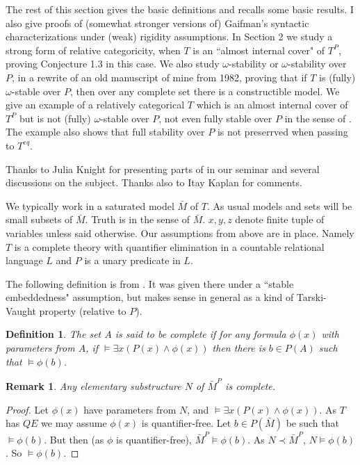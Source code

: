 \documentclass[12pt]{article}
\newtheorem{Definition}[Theorem]{Definition}
\newtheorem{Remark}[Theorem]{Remark}
\begin{document}
The rest of this section  gives the basic definitions and recalls some basic results. I also give proofs of (somewhat stronger versions of) Gaifman's syntactic characterizations  under (weak) rigidity assumptions. 
In Section 2 we study a strong form of relative categoricity, when $T$ is an ``almost internal cover" of $T^{P}$, proving Conjecture 1.3 in this case.  We also  study  $\omega$-stability or $\omega$-stability over $P$, in a rewrite of an old manuscript of mine from 1982, proving that if $T$ is (fully) $\omega$-stable over $P$, then over any complete set there is a constructible model.  We give an example of a relatively categorical $T$ which is an almost internal cover of $T^{P}$ but is not (fully) $\omega$-stable over $P$, not even fully stable over $P$ in the sense of \cite{Usvyatsov}.  The example also shows that full stability over $P$ is not preserrved when passing to $T^{eq}$. 


Thanks to Julia Knight for presenting parts of \cite{S-U} in our seminar and several discussions on the subject. Thanks also to Itay Kaplan for  comments. 

We typically work in a saturated model $\bar M$ of $T$. As usual models and sets will be small subsets of $\bar M$. Truth is in the sense of $\bar M$.  $x,y,z$ denote finite tuple of variables unless said otherwise. Our assumptions from above are in place. Namely $T$ is a complete theory with quantifier elimination in a countable relational language $L$ and $P$ is a unary predicate in $L$. 
 
The following definition is from \cite{Pillay-Shelah}.  It was given there under a ``stable embeddedness" assumption, but makes sense in general as a kind of Tarski-Vaught property (relative to $P$). 

\begin{Definition} The set $A$ is said to be complete if for any formula $\phi(x)$ with parameters from $A$, if $\models \exists x(P(x)\wedge \phi(x))$ then there is $b\in P(A)$ such that $\models\phi(b)$.
\end{Definition} 

\begin{Remark} Any elementary substructure $N$ of ${\bar M}^{P}$ is complete.
\end{Remark}
\begin{proof} Let $\phi(x)$ have parameters from $N$, and $\models \exists x(P(x)\wedge \phi(x))$. As $T$ has $QE$ we may assume $\phi(x)$ is quantifier-free. 
Let $b\in P({\bar M})$ be such that $\models \phi(b)$.  But then (as $\phi$ is quantifier-free), ${\bar M}^{P}\models \phi(b)$. As $N\prec {\bar M}^{P}$, $N\models \phi(b)$.
So $\models \phi(b)$.
\end{proof} 
\end{document}
